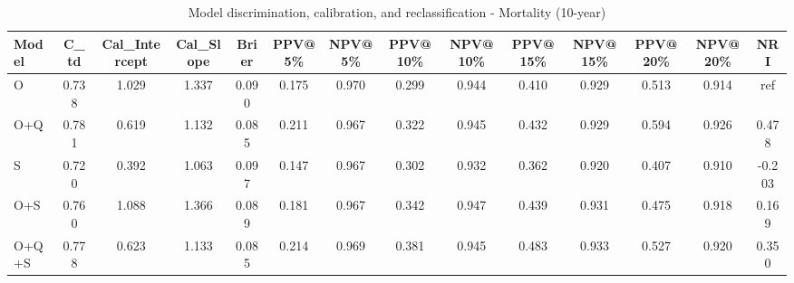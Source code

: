 \begin{table}[htbp]
\centering
\small
\caption{Model discrimination, calibration, and reclassification - Mortality (10-year)}
\label{tab:perf_mortality_10y}
\begin{tabular}{lccccccccccccc}
\toprule
Model & C\_td & Cal\_Intercept & Cal\_Slope & Brier & PPV@5\% & NPV@5\% & PPV@10\% & NPV@10\% & PPV@15\% & NPV@15\% & PPV@20\% & NPV@20\% & NRI \\
\midrule
O & 0.738 & 1.029 & 1.337 & 0.090 & 0.175 & 0.970 & 0.299 & 0.944 & 0.410 & 0.929 & 0.513 & 0.914 & ref \\
O+Q & 0.781 & 0.619 & 1.132 & 0.085 & 0.211 & 0.967 & 0.322 & 0.945 & 0.432 & 0.929 & 0.594 & 0.926 & 0.478 \\
S & 0.720 & 0.392 & 1.063 & 0.097 & 0.147 & 0.967 & 0.302 & 0.932 & 0.362 & 0.920 & 0.407 & 0.910 & -0.203 \\
O+S & 0.760 & 1.088 & 1.366 & 0.089 & 0.181 & 0.967 & 0.342 & 0.947 & 0.439 & 0.931 & 0.475 & 0.918 & 0.169 \\
O+Q+S & 0.778 & 0.623 & 1.133 & 0.085 & 0.214 & 0.969 & 0.381 & 0.945 & 0.483 & 0.933 & 0.527 & 0.920 & 0.350 \\
\bottomrule
\end{tabular}
\end{table}